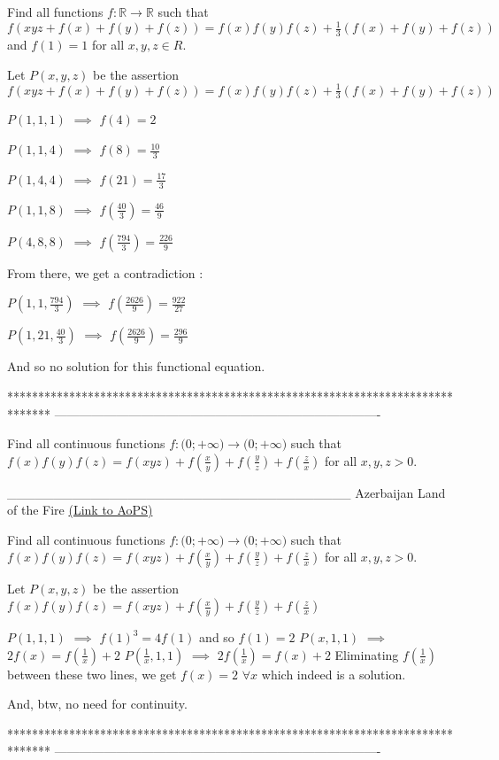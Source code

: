 \begin{solution}
	\begin{tcolorbox}Find all functions $f: \mathbb{R}\to\mathbb{R}$ such that $f(xyz+f(x)+f(y)+f(z))=f(x)f(y)f(z)+\frac{1}{3}(f(x)+f(y)+f(z))$ and $f(1)=1$ for all $x,y,z{\in}R$.\end{tcolorbox}
Let $P(x,y,z)$ be the assertion $f(xyz+f(x)+f(y)+f(z))=f(x)f(y)f(z)+\frac 13(f(x)+f(y)+f(z))$

$P(1,1,1)$ $\implies$ $f(4)=2$

$P(1,1,4)$ $\implies$ $f(8)=\frac{10}3$

$P(1,4,4)$ $\implies$ $f(21)=\frac{17}3$

$P(1,1,8)$ $\implies$ $f(\frac{40}3)=\frac{46}9$

$P(4,8,8)$ $\implies$ $f(\frac{794}3)=\frac{226}9$

From there, we get a contradiction :

$P(1,1,\frac{794}3)$ $\implies$ $f(\frac{2626}9)=\frac{922}{27}$

$P(1,21,\frac{40}3)$ $\implies$ $f(\frac{2626}9)=\frac{296}9$

And so no solution for this functional equation.
\end{solution}
*******************************************************************************
-------------------------------------------------------------------------------

\begin{problem}
	Find all continuous functions ${{f: \mathbb(0;+\infty)}\to\mathbb(0;+\infty)}$ such that $f(x)f(y)f(z)=f(xyz)+f(\frac{x}{y})+f(\frac{y}{z})+f(\frac{z}{x})$ for all $x,y,z>0$.


_____________________________________
Azerbaijan Land of the Fire 
	\flushright \href{https://artofproblemsolving.com/community/c6h532138}{(Link to AoPS)}
\end{problem}



\begin{solution}
	\begin{tcolorbox}Find all continuous functions ${{f: \mathbb(0;+\infty)}\to\mathbb(0;+\infty)}$ such that $f(x)f(y)f(z)=f(xyz)+f(\frac{x}{y})+f(\frac{y}{z})+f(\frac{z}{x})$ for all $x,y,z>0$.\end{tcolorbox}
Let $P(x,y,z)$ be the assertion $f(x)f(y)f(z)=f(xyz)+f(\frac xy)+f(\frac yz)+f(\frac zx)$

$P(1,1,1)$ $\implies$ $f(1)^3=4f(1)$ and so $f(1)=2$
$P(x,1,1)$ $\implies$ $2f(x)=f(\frac 1x)+2$
$P(\frac 1x,1,1)$ $\implies$ $2f(\frac 1x)=f(x)+2$
Eliminating $f(\frac 1x)$ between these two lines, we get $\boxed{f(x)=2}$ $\forall x$ which indeed is a solution.

And, btw, no need for continuity.
\end{solution}
*******************************************************************************
-------------------------------------------------------------------------------

